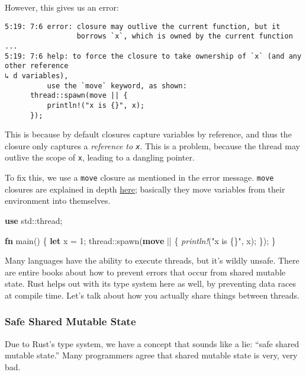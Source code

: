 \documentclass[a4paper,]{book}
\newenvironment{Shaded}{\begin{snugshade}}{\end{snugshade}}
\newcommand{\KeywordTok}[1]{\textcolor[rgb]{0.13,0.29,0.53}{\textbf{{#1}}}}
\newcommand{\DecValTok}[1]{\textcolor[rgb]{0.00,0.00,0.81}{{#1}}}
\newcommand{\StringTok}[1]{\textcolor[rgb]{0.31,0.60,0.02}{{#1}}}
\newcommand{\PreprocessorTok}[1]{\textcolor[rgb]{0.56,0.35,0.01}{\textit{{#1}}}}
\newcommand{\NormalTok}[1]{{#1}}
\begin{document}
However, this gives us an error:

\begin{verbatim}
5:19: 7:6 error: closure may outlive the current function, but it
                 borrows `x`, which is owned by the current function
...
5:19: 7:6 help: to force the closure to take ownership of `x` (and any other reference
↳ d variables),
          use the `move` keyword, as shown:
      thread::spawn(move || {
          println!("x is {}", x);
      });
\end{verbatim}

This is because by default closures capture variables by reference, and
thus the closure only captures a \emph{reference to \texttt{x}}. This is
a problem, because the thread may outlive the scope of \texttt{x},
leading to a dangling pointer.

To fix this, we use a \texttt{move} closure as mentioned in the error
message. \texttt{move} closures are explained in depth
\protect\hyperlink{move-closures}{here}; basically they move variables
from their environment into themselves.

\begin{Shaded}
\begin{Highlighting}[]
\KeywordTok{use} \NormalTok{std::thread;}

\KeywordTok{fn} \NormalTok{main() \{}
    \KeywordTok{let} \NormalTok{x = }\DecValTok{1}\NormalTok{;}
    \NormalTok{thread::spawn(}\KeywordTok{move} \NormalTok{|| \{}
        \PreprocessorTok{println!}\NormalTok{(}\StringTok{"x is \{\}"}\NormalTok{, x);}
    \NormalTok{\});}
\NormalTok{\}}
\end{Highlighting}
\end{Shaded}

Many languages have the ability to execute threads, but it's wildly
unsafe. There are entire books about how to prevent errors that occur
from shared mutable state. Rust helps out with its type system here as
well, by preventing data races at compile time. Let's talk about how you
actually share things between threads.

\subsubsection{Safe Shared Mutable
State}\label{safe-shared-mutable-state}

Due to Rust's type system, we have a concept that sounds like a lie:
``safe shared mutable state.'' Many programmers agree that shared
mutable state is very, very bad.
\end{document}
